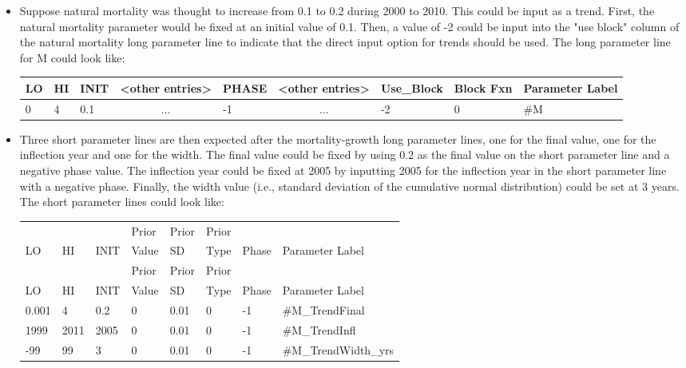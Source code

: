 \begin{itemize}
	\item Suppose natural mortality was thought to increase from 0.1 to 0.2 during 2000 to 2010. This could be input as a trend. First, the natural mortality parameter would be fixed at an initial value of 0.1. Then, a value of -2 could be input into the "use block" column of the natural mortality long parameter line to indicate that the direct input option for trends should be used. The long parameter line for M could look like:
	\begin{center}
		\begin{longtable}{p{1cm} p{1cm} p{1cm}  p{1.5cm}  p{1cm}  p{1.5cm}  p{1.5cm} p{1.5cm} p{3cm}}
			
			\hline
			LO \Tstrut & HI & INIT & <other entries> & PHASE & <other entries> & Use\_Block & Block Fxn & Parameter Label\Bstrut\\
			\hline
			0          & 4 & 0.1 &  \multicolumn{1}{c}{...} & -1 & \multicolumn{1}{c}{...} & -2 & 0 & \#M \Bstrut\\
			\hline
		\end{longtable}
	\end{center}

	\item Three short parameter lines are then expected after the mortality-growth long parameter lines, one for the final value, one for the inflection year and one for the width. The final value could be fixed by using 0.2 as the final value on the short parameter line and a negative phase value. The inflection year could be fixed at 2005 by inputting 2005 for the inflection year in the short parameter line with a negative phase. Finally, the width value (i.e., standard deviation of the cumulative normal distribution) could be set at 3 years. The short parameter lines could look like:
	
	\begin{longtable}{ p{0.7cm} p{0.7cm} p{0.7cm}  p{1cm}  p{1.4cm}  p{1cm} p{1cm} p{6.7cm}}
	\hline
	&    &      & Prior &  Prior & Prior & & \Tstrut\\
	LO & HI & INIT & Value &  SD    & Type  & Phase & Parameter Label \Bstrut\\
	\hline
	\endfirsthead
	
	\hline
	&    &      & Prior &  Prior & Prior &  & \Tstrut\\
	LO & HI & INIT & Value &  SD    & Type  & Phase & Parameter Label \Bstrut\\
	\hline
	\endhead
	
	\endfoot
	
	\endlastfoot
	
	0.001 & 4    & 0.2  & 0 & 0.01 & 0 & -1 &\#M\_TrendFinal\Tstrut\\
	1999  & 2011 & 2005 & 0 & 0.01 & 0 & -1 &\#M\_TrendInfl\Bstrut\\
	-99   & 99   & 3    & 0 & 0.01 & 0 & -1 &\#M\_TrendWidth\_yrs\Bstrut\\
	\hline
\end{longtable}
\end{itemize}

